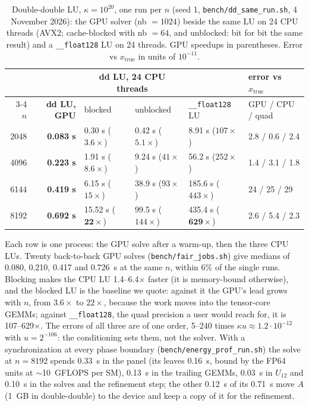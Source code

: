 \documentclass[11pt]{article}
\begin{document}
\begin{table}[h]\centering
\caption{Double-double LU, $\kappa=10^{20}$, one run per $n$ (seed 1, \texttt{bench/dd\_same\_run.sh}, 4 November 2026): the
GPU solver (nb $=1024$) beside the same LU on 24 CPU threads (AVX2; cache-blocked with nb $=64$, and unblocked: bit for bit
the same result) and a \texttt{\_\_float128} LU on 24 threads. GPU speedups in parentheses. Error vs $x_{\mathrm{true}}$ in
units of $10^{-11}$.}\label{tab:dd}
\footnotesize\setlength{\tabcolsep}{3.5pt}
\begin{tabular}{rrllll}\toprule
& & \multicolumn{2}{c}{dd LU, 24 CPU threads} & & error vs $x_{\mathrm{true}}$ \\\cmidrule(lr){3-4}
$n$ & \textbf{dd LU, GPU} & blocked & unblocked & \texttt{\_\_float128} LU & GPU / CPU / quad \\\midrule
2048 & \textbf{0.083 s} & 0.30 s ($3.6\times$) & 0.42 s ($5.1\times$) & 8.91 s ($107\times$) & 2.8 / 0.6 / 2.4 \\
4096 & \textbf{0.223 s} & 1.91 s ($8.6\times$) & 9.24 s ($41\times$) & 56.2 s ($252\times$) & 1.4 / 3.1 / 1.8 \\
6144 & \textbf{0.419 s} & 6.15 s ($15\times$) & 38.9 s ($93\times$) & 185.6 s ($443\times$) & 24 / 25 / 29 \\
8192 & \textbf{0.692 s} & 15.52 s ($\mathbf{22\times}$) & 99.5 s ($144\times$) & 435.4 s ($\mathbf{629\times}$) & 2.6 / 5.4 / 2.3 \\\bottomrule
\end{tabular}
\end{table}
Each row is one process: the GPU solve after a warm-up, then the three CPU LUs. Twenty back-to-back GPU solves
(\texttt{bench/fair\_jobs.sh}) give medians of 0.080, 0.210, 0.417 and 0.726~s at the same $n$, within 6\% of the single runs. Blocking
makes the CPU LU 1.4--6.4$\times$ faster (it is memory-bound otherwise), and the blocked LU is the baseline we quote: against
it the GPU's lead grows with $n$, from $3.6\times$ to $22\times$, because the work moves into the tensor-core GEMMs; against
\texttt{\_\_float128}, the quad precision a user would reach for, it is 107--629$\times$. The errors of all three are of one order,
5--240 times $\kappa u\approx1.2\cdot10^{-12}$ with $u=2^{-106}$: the conditioning sets them, not the solver.
With a synchronization at every phase boundary (\texttt{bench/energy\_prof\_run.sh}) the solve at $n=8192$ spends 0.33~s in
the panel (its leaves 0.16~s, bound by the FP64 units at $\sim$10~GFLOPS per SM), 0.13~s in the trailing GEMMs, 0.03~s in
$U_{12}$ and 0.10~s in the solves and the refinement step; the other 0.12~s of its 0.71~s move $A$ (1~GB in double-double)
to the device and keep a copy of it for the refinement.
\end{document}
